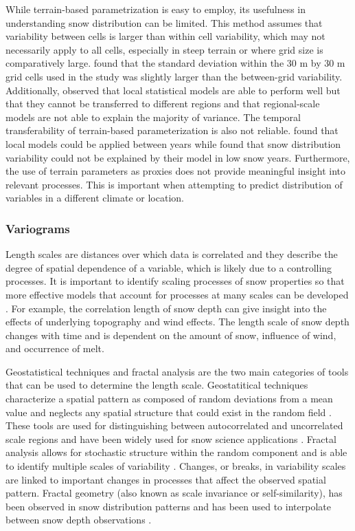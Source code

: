 \documentclass[12pt]{article}
\begin{document}
While terrain-based parametrization is easy to employ, its usefulness in understanding snow distribution can be limited. This method assumes that variability between cells is larger than within cell variability, which may not necessarily apply to all cells, especially in steep terrain or where grid size is comparatively large. \cite{Marchand2005} found that the standard deviation within the 30 m by 30 m grid cells used in the study was slightly larger than the between-grid variability. Additionally, \cite{Grunewald2013} observed that local statistical models are able to perform well but that they cannot be transferred to different regions and that regional-scale models are not able to explain the majority of variance. The temporal transferability of terrain-based parameterization is also not reliable. \cite{Grunewald2013} found that local models could be applied between years while \cite{Revuelto2014} found that snow distribution variability could not be explained by their model in low snow years. Furthermore, the use of terrain parameters as proxies does not provide meaningful insight into relevant processes. This is important when attempting to predict distribution of variables in a different climate or location. 

\subsubsection{Variograms}
Length scales are distances over which data is correlated and they describe the degree of spatial dependence of a variable, which is likely due to a controlling processes. It is important to identify scaling processes of snow properties so that more effective models that account for processes at many scales can be developed \citep{Bloeschl1999, Deems2006a}. For example, the correlation length of snow depth can give insight into the effects of underlying topography and wind effects. The length scale of snow depth changes with time and is dependent on the amount of snow, influence of wind, and occurrence of melt. 

Geostatistical techniques and fractal analysis are the two main categories of tools that can be used to determine the length scale. Geostatitical techniques characterize a spatial pattern as composed of random deviations from a mean value and neglects any spatial structure that could exist in the random field \citep{Deems2006a}. These tools are used for distinguishing between autocorrelated and uncorrelated scale regions and have been widely used for snow science applications \citep[e.g][]{Bloeschl1999, Deems2006, Marshall2006}. Fractal analysis allows for stochastic structure within the random component and is able to identify multiple scales of variability \citep{Deems2006a}. Changes, or breaks, in variability scales are linked to important changes in processes that affect the observed spatial pattern. Fractal geometry (also known as scale invariance or self-similarity), has been observed in snow distribution patterns \citep{Shook1996, Granger2002, Deems2006a,Trujillo2007, Deems2008} and has been used to interpolate between snow depth observations \citep{Shook1997}.
\end{document}
